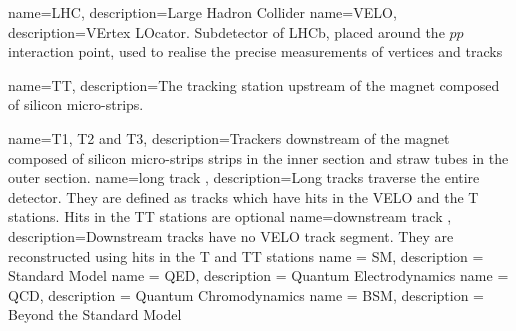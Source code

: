                  {
                   name=LHC,
                   description={Large Hadron Collider}
                 }
                 {
                   name=VELO,
                   description={VErtex LOcator. Subdetector of LHCb, placed around the $pp$ interaction point, used to realise the precise measurements of vertices and tracks}
                 }

	{
                   name=TT,
                   description={The tracking station upstream of the magnet composed of silicon micro-strips.}
        }


                 {
                   name=T1{,} T2 and T3,
                   description={Trackers downstream of the magnet composed of silicon micro-strips strips in the inner section and straw tubes in the outer section.}
                 }
              {
                   name=long track ,
                   description={Long tracks traverse the entire detector. They are defined as tracks which have hits in the VELO and the T stations. Hits in the TT stations are optional}
              }
              {
                   name=downstream track ,
                   description={Downstream tracks have no VELO track segment. They are reconstructed using hits in the T and TT stations}
              }
                 {      
                 name = SM,
                 description = {Standard Model}     
                 }
                 {      
                 name = QED,
                 description = {Quantum Electrodynamics}     
                 }
                 {      
                 name = QCD,
                 description = {Quantum Chromodynamics}     
                 }
                 {      
                 name = BSM,
                 description = {Beyond the Standard Model}     
                 }
                  
